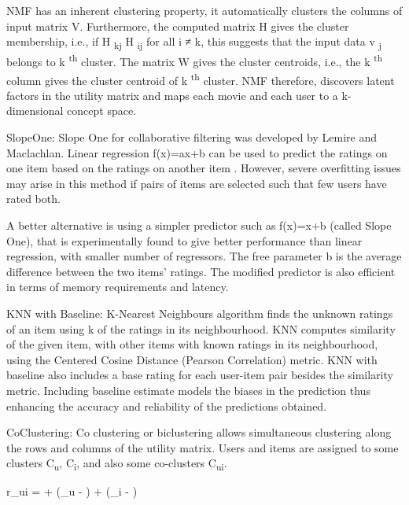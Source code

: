 \documentclass[sigconf]{acmart}
\begin{document}
NMF has an inherent clustering property\cite{Ding05onthe}, it automatically clusters the columns of input matrix V. Furthermore, the computed matrix H gives the cluster membership, i.e., if H \textsubscript{kj} \beginmath{}{\geq}\endmath{} H \textsubscript{ij} for all i ≠ k, this suggests that the input data v \textsubscript{j} belongs to k \textsuperscript{th} cluster. The matrix W gives the cluster centroids, i.e., the k \textsuperscript{th} column gives the cluster centroid of k \textsuperscript{th} cluster. NMF therefore, discovers latent factors in the utility matrix and maps each movie and each user to a k-dimensional concept space.

SlopeOne: Slope One for collaborative filtering was developed by Lemire and Maclachlan\cite{lemire2007slope}. Linear regression f(x)=ax+b can be used to predict the ratings on one item based on the ratings on another item \cite{articleregcoll}. However, severe overfitting issues may arise in this method if pairs of items are selected such that few users have rated both.

\cite{slopeonewiki}A better alternative is using a simpler predictor such as f(x)=x+b (called Slope One), that is experimentally found to give better performance than linear regression, with smaller number of regressors. The free parameter b is the average difference between the two items' ratings. The modified predictor is also efficient in terms of memory requirements and latency.

KNN with Baseline: K-Nearest Neighbours algorithm \cite{10.2307/2685209} finds the unknown ratings of an item using k of the ratings in its neighbourhood. KNN computes similarity of the given item, with other items with known ratings in its neighbourhood, using the Centered Cosine Distance (Pearson Correlation) metric. KNN with baseline \cite{knnbaseline} also includes a base rating for each user-item pair besides the similarity metric. Including baseline estimate models the biases in the prediction thus enhancing the accuracy and reliability of the predictions obtained.

CoClustering: Co clustering or biclustering \cite{RePEc:eee:csdana:v:52:y:2008:i:6:p:3233-3245} allows simultaneous clustering along the rows and columns of the utility matrix. Users and items are assigned to some clusters C\textsubscript{u}, C\textsubscript{i}, and also some co-clusters C\textsubscript{ui}\cite{coclustering}.

\beginmath{}
r_{ui} =  + (\mu_u - ) + (\mu_i
- )
\endmath{}
\end{document}
